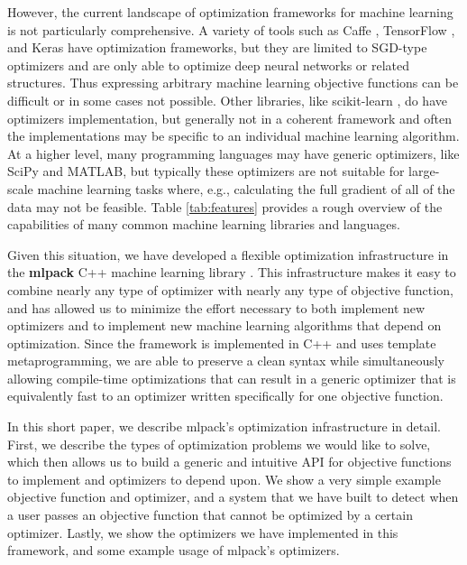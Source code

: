 \documentclass{article}
\begin{document}
However, the current landscape of optimization frameworks for machine learning
is not particularly comprehensive.  A variety of tools such as
Caffe \cite{jia2014caffe},
TensorFlow \cite{abadi2016tensorflow},
and
Keras \cite{chollet2015}
have optimization frameworks, but they are limited to SGD-type optimizers and
are only able to optimize deep neural networks or related structures.  Thus
expressing arbitrary machine learning objective functions can be difficult or in
some cases not possible.  Other libraries, like
scikit-learn \cite{pedregosa2011scikit},
do have optimizers implementation, but generally not in a coherent framework and
often the implementations may be specific to an individual machine learning
algorithm.  At a higher level, many programming languages may have generic
optimizers, like SciPy \cite{jones2014scipy} and MATLAB, but typically these
optimizers are not suitable for large-scale machine learning tasks where, e.g.,
calculating the full gradient of all of the data may not be feasible.  Table
\ref{tab:features} provides a rough overview of the capabilities of many common
machine learning libraries and languages.

Given this situation, we have developed a flexible optimization infrastructure
in the {\bf mlpack} C++ machine learning library \cite{mlpack2013}.  This
infrastructure makes it easy to combine nearly any type of optimizer with nearly
any type of objective function, and has allowed us to minimize the effort
necessary to both implement new optimizers and to implement new machine learning
algorithms that depend on optimization.  Since the framework is implemented in
C++ and uses template metaprogramming, we are able to preserve a clean syntax
while simultaneously allowing compile-time optimizations that can result in a
generic optimizer that is equivalently fast to an optimizer written specifically
for one objective function.

In this short paper, we describe mlpack's optimization infrastructure in detail.
First, we describe the types of optimization problems we would like to solve,
which then allows us to build a generic and intuitive API for objective
functions to implement and optimizers to depend upon.  We show a very simple
example objective function and optimizer, and a system that we have built to
detect when a user passes an objective function that cannot be optimized by a
certain optimizer.  Lastly, we show the optimizers we have implemented in this
framework, and some example usage of mlpack's optimizers.
\end{document}
